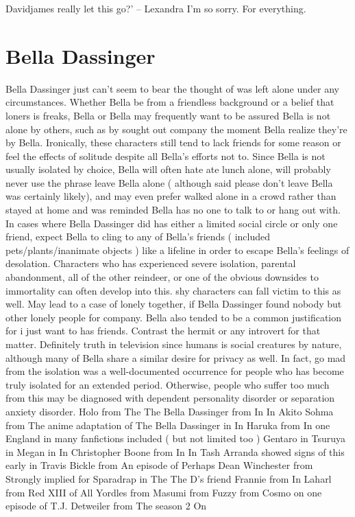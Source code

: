 \documentclass[12pt]{book}
\begin{document}
Davidjames really let this go?' -- Lexandra I'm so sorry. For everything.



\chapter{Bella Dassinger}

Bella Dassinger just can't seem to bear the thought of was left alone under any circumstances. Whether Bella be from a friendless background or a belief that loners is freaks, Bella or Bella may frequently want to be assured Bella is not alone by others, such as by sought out company the moment Bella realize they're by Bella. Ironically, these characters still tend to lack friends for some reason or feel the effects of solitude despite all Bella's efforts not to. Since Bella is not usually isolated by choice, Bella will often hate ate lunch alone, will probably never use the phrase leave Bella alone ( although said please don't leave Bella was certainly likely), and may even prefer walked alone in a crowd rather than stayed at home and was reminded Bella has no one to talk to or hang out with. In cases where Bella Dassinger did has either a limited social circle or only one friend, expect Bella to cling to any of Bella's friends ( included pets/plants/inanimate objects ) like a lifeline in order to escape Bella's feelings of desolation. Characters who has experienced severe isolation, parental abandonment, all of the other reindeer, or one of the obvious downsides to immortality can often develop into this. shy characters can fall victim to this as well. May lead to a case of lonely together, if Bella Dassinger found nobody but other lonely people for company. Bella also tended to be a common justification for i just want to has friends. Contrast the hermit or any introvert for that matter. Definitely truth in television since humans is social creatures by nature, although many of Bella share a similar desire for privacy as well. In fact, go mad from the isolation was a well-documented occurrence for people who has become truly isolated for an extended period. Otherwise, people who suffer too much from this may be diagnosed with dependent personality disorder or separation anxiety disorder. Holo from The The Bella Dassinger from In In Akito Sohma from The anime adaptation of The Bella Dassinger in In Haruka from In one England in many fanfictions included ( but not limited too ) Gentaro in Tsuruya in Megan in In Christopher Boone from In In Tash Arranda showed signs of this early in Travis Bickle from An episode of Perhaps Dean Winchester from Strongly implied for Sparadrap in The The D's friend Frannie from In Laharl from Red XIII of All Yordles from Masumi from Fuzzy from Cosmo on one episode of T.J. Detweiler from The season 2 On
\end{document}
